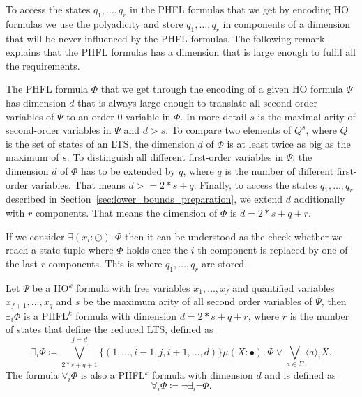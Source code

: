 To access the states $q_1, \dots, q_r$ in the PHFL formulas that we get by encoding HO 
formulas we use the polyadicity and store $q_1, \dots, q_r$ in components of a dimension that 
will be never influenced by the PHFL formulas. The following remark explains that the PHFL 
formulas has a dimension that is large enough to fulfil all the requirements. 

\begin{remark}
    The PHFL formula $\Phi$ that we get through the encoding of a given HO formula $\Psi$ has dimension
    $d$ that is always large enough to translate all second-order variables of $\Psi$ to an order $0$ variable in
    $\Phi$. In more detail $s$ is the maximal arity of second-order variables in $\Psi$ and $d > s$. To compare
    two  elements of $Q^{s}$, where $Q$ is the set of states of an LTS, the dimension $d$ of 
    $\Phi$ is  at least twice as big as the maximum of $s$. To distinguish all
    different first-order variables in $\Psi$, the dimension $d$ of $\Phi$ has to be extended by $q$, where $q$ is the number of different first-order variables. That means $d >= 2 * s + q$. Finally, to access the 
    states $q_1, \dots, q_r$ described in Section~\ref{sec:lower_bounds_preparation}, 
    we extend $d$ additionally with $r$ components. That means the dimension of $\Phi$ is $d = 2 * s + q + r$.
\end{remark}

If we consider $\exists (x_i \colon \odot).\,\Phi$ then it can be understood as the check whether we reach a state tuple where $
\Phi$ holds once the $i$-th component is replaced by one of the last $r$ components. This is where $q_1, \dots, q_r$ are stored.

\begin{definition}
    Let $\Psi$ be a HO$^k$ formula with free variables $x_1, \dots, x_f$ and quantified variables $x_{f+1}, \dots,
    x_q$ and $s$ be the maximum arity of all second order variables of $\Psi$, then $\exists_i \Phi$ is a PHFL$^k$
    formula with dimension $d = 2 * s + q+ r$, where $r$ is the number of states that define the 
    reduced LTS, defined as
    \[\exists_i \Phi \coloneqq \bigvee^{j=d}_{2*s+q+1} \{(1, \dots, i-1, j, i + 1, \dots, d)\} \mu (X
    \colon \bullet).\,\Phi \vee \bigvee_{a \in \Sigma} \langle a \rangle_{i} X.\]
    The formula $\forall_i \Phi$ is also a PHFL$^k$ formula with dimension $d$ and is defined as
    \[\forall_i \Phi \coloneqq \neg \exists_i \neg \Phi.\]
\end{definition}

